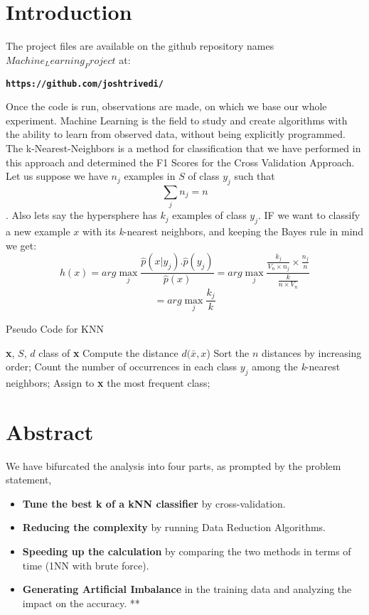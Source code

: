 \documentclass{article}
\begin{document}
\section{Introduction}
\label{submission}

The project files are available on the github repository names $Machine_Learning_Project$ at:
\begin{center}
\textbf{\texttt{https://github.com/joshtrivedi/}}
\end{center}

Once the code is run, observations are made, on which we base our whole experiment. Machine Learning is the field to study and create algorithms with the ability to learn from observed data, without being explicitly programmed.
The k-Nearest-Neighbors is a method for classification that we have performed in this approach and determined the F1 Scores for the Cross Validation Approach. 
Let us suppose we have \mbox{$n_{j}$} examples in \mbox{$S$} of class \mbox{$y_{j}$} such that \[ \sum_{j} n_{j} = n\].
Also lets say the hypersphere has \mbox{$k_{j}$} examples of class \mbox{$y_{j}$}. IF we want to classify a new example \mbox{$x$} with its \textit{k}-nearest neighbors, and keeping the Bayes rule in mind we get:
\[ h(x) = \textit{arg} \max_{j} \frac{\hat{p}(x|y_{j}).\hat{p}(y_{j})}{\hat{p}(x)} = \textit{arg} \max_{j} \frac{ \frac{k_{j}}{V_{n} \times n_{j}} \times \frac{n_{j}}{n} }{\frac{k}{n \times V_{n}}} \]
\[ = \textit{arg} \max_{j} \frac{k_{j}}{k} \]

\begin{algorithm}[tb]
   \caption{Pseudo Code for KNN}
   \label{alg:example}
\begin{algorithmic}
    \textbf{x}, $S$, $d$
    class of \textbf{x}
   \STATE Compute the distance $d(\bar{x},x$)
   \ENDFOR
   \STATE Sort the $n$ distances by increasing order;
   \STATE Count the number of occurrences in each class $y_{j}$ among the \textit{k}-nearest neighbors;
   \STATE Assign to \textbf{x} the most frequent class;
\end{algorithmic}
\end{algorithm}


\section{Abstract}

We have bifurcated the analysis into four parts, as prompted by the problem statement, 
\begin{itemize}
\item \textbf{Tune the best k of a kNN classifier} by cross-validation. 
\item \textbf{Reducing the complexity} by running Data Reduction Algorithms.
\item \textbf{Speeding up the calculation} by comparing the two methods in terms of time (1NN with brute force).
\item \textbf{Generating Artificial Imbalance} in the training data and analyzing the impact on the accuracy. **

\end{itemize}
\end{document}
